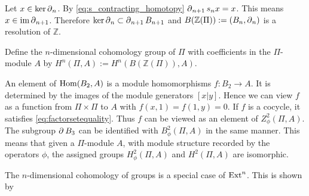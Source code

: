 Let $x\in \ker\operatorname{\partial}_{n}$. By \eqref{eq:s_contracting_homotopy} $\operatorname{\partial}_{n+1}s_nx=x$. This means $x\in \operatorname{im}\operatorname{\partial}_{n+1}$.
Therefore $\ker \operatorname{\partial}_{n} \subset \operatorname{\partial}_{n+1} B_{n+1}$ and $B(\mathbb{Z}(\Pi)) := (B_n,\operatorname{\partial}_{n})$ is a resolution of $\mathbb{Z}$.

Define the $n$-dimensional cohomology group of $\Pi$ with coefficients in the $\Pi$-module $A$ by $H^n(\Pi,A) := H^n(B(\mathbb{Z}(\Pi)),A)$.

An element of $\operatorname{Hom}(B_2,A)$ is a module homomorphisms $f:B_2 \to A$.
It is determined by the images of the module generators $[x|y]$.
Hence we can view $f$ as a function from $\Pi \times \Pi$ to $A$ with $f(x,1) = f(1,y) = 0$.
If $f$ is a cocycle, it satisfies \eqref{eq:factorsetequality}.
Thus $f$ can be viewed as an element of $Z^2_\phi(\Pi,A)$.
The subgroup $\operatorname{\partial}_{}B_3$ can be identified with $B_\phi^2(\Pi, A)$ in the same manner.
This means that given a $\Pi$-module $A$, with module structure recorded by the operators $\phi$, the assigned groups $H^2_\phi(\Pi, A)$ and $H^2(\Pi,A)$ are isomorphic.

The $n$-dimensional cohomology of groups is a special case of $\operatorname{Ext}^{n}$.
This is shown by

